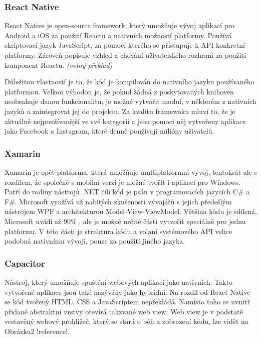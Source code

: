 \documentclass[
  biblatex,
  glossaries,
  index
]{kidiplom}
\begin{document}
\subsubsection{React Native}
React Native je open-source framework, který umožňuje vývoj aplikací pro Android a iOS za použití Reactu a nativních možností platformy. Používá skriptovací jazyk JavaScript, za pomocí kterého se přistupuje k API konkretní platformy. Zároveň popisuje vzhled a chování  uživatelského rozhraní za použití komponent Reactu.
\cite{3}
\textit{(volný překlad)}

Důležitou vlastností je to, že kód je kompilován do nativního jazyku používaného platformou. Velkou výhodou je, že pokud žádná z poskytovaných knihoven neobsahuje danou funkcionalitu, je možné vytvořit modul, v některém z nativních jazyků a zaintegrovat jej do projektu. Za kvalitu framewoku mluví to, že je aktuálně nejpoužívanější ve své kategorii a jsou pomoci něj vytvořeny aplikace jako Facebook a Instagram, které denně používají milióny uživatelů.

\subsubsection{Xamarin}
Xamarin je opět platforma, která umožňuje multiplatformní vývoj, tentokrát ale s rozdílem, že společně s mobilní verzí je možné tvořit i aplikaci pro Windows. Patří do rodiny nástrojů .NET čili kód je psán v programovacích jazycích C\# a F\#. Microsoft využívá už nabitých zkušeností vývojářů s jejich předešlým nástrojem WPF a architekturou Model-View-ViewModel. Většina kódu je sdílená, Microsoft uvádí až 90\% \cite{4}, ale je možné určité části vytvořit speciálně pro jednu platformu. V této části je struktura kódu a volaní systémového API velice podobná nativnímu vývoji, pouze za použití jiného jazyka.

\subsubsection{Capacitor}
Nástroj, který umožňuje spuštění webových aplikací jako nativních. Takto vytvořené aplikace jsou také nazývány jako hybridní. Na rozdíl od React Native se kód tvořený HTML, CSS a JavaScriptem nepřekládá. Namísto toho se uvnitř přidané abstraktní vrstvy otevírá takzvané web view. Web view je v podstatě vestavěný webový prohlížeč, který se stará o běh a zobrazení kódu, lze vidět na Obrázku2 !reference!.  
\end{document}
